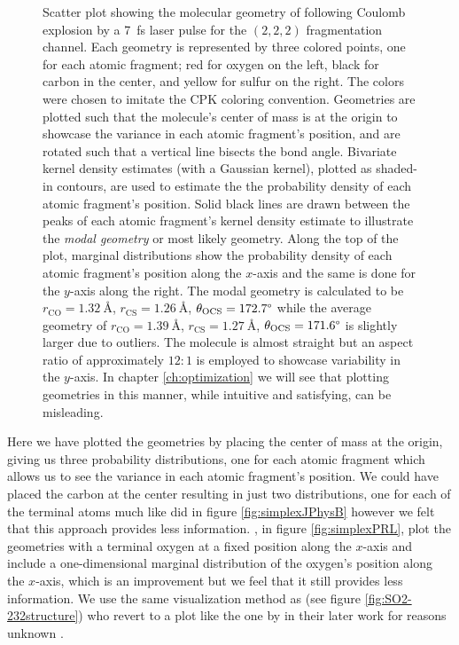 \begin{figure}
  {Scatter plot showing the molecular geometry of  following Coulomb explosion by a \SI{7}{\fs} laser pulse for the $(2,2,2)$ fragmentation channel. Each geometry is represented by three colored points, one for each atomic fragment; red for oxygen on the left, black for carbon in the center, and yellow for sulfur on the right. The colors were chosen to imitate the CPK coloring convention. Geometries are plotted such that the molecule's center of mass is at the origin to showcase the variance in each atomic fragment's position, and are rotated such that a vertical line bisects the  bond angle. Bivariate kernel density estimates (with a Gaussian kernel), plotted as shaded-in contours, are used to estimate the the probability density of each atomic fragment's position. Solid black lines are drawn between the peaks of each atomic fragment's kernel density estimate to illustrate the \emph{modal geometry} or most likely geometry. Along the top of the plot, marginal distributions show the probability density of each atomic fragment's position along the $x$-axis and the same is done for the $y$-axis along the right. The modal geometry is calculated to be $r_\mathrm{CO} = \SI{1.32}{\angstrom}$, $r_\mathrm{CS} = \SI{1.26}{\angstrom}$, $ \theta_\mathrm{OCS} = 172.7\degree$ while the average geometry of $r_\mathrm{CO} = \SI{1.39}{\angstrom}$, $r_\mathrm{CS} = \SI{1.27}{\angstrom}$, $ \theta_\mathrm{OCS} = 171.6\degree$ is slightly larger due to outliers. The molecule is almost straight but an aspect ratio of approximately $12:1$ is employed to showcase variability in the $y$-axis. In chapter \ref{ch:optimization} we will see that plotting geometries in this manner, while intuitive and satisfying, can be misleading.}
  \label{fig:OCS2227fsLTGeometry}
\end{figure}

Here we have plotted the geometries by placing the center of mass at the origin, giving us three probability distributions, one for each atomic fragment which allows us to see the variance in each atomic fragment's position. We could have placed the carbon at the center resulting in just two distributions, one for each of the terminal atoms much like \citet{Brichta07} did in figure \ref{fig:simplexJPhysB} however we felt that this approach provides less information. \cite{Bocharova11}, in figure \ref{fig:simplexPRL}, plot the geometries with a terminal oxygen at a fixed position along the $x$-axis and include a one-dimensional marginal distribution of the oxygen's position along the $x$-axis, which is an improvement but we feel that it still provides less information.  We use the same visualization method as \citet{Legare05structure} (see figure \ref{fig:SO2-232structure}) who revert to a plot like the one by \citet{Bocharova11} in their later work for reasons unknown \citep{Legare05dynamics}.

